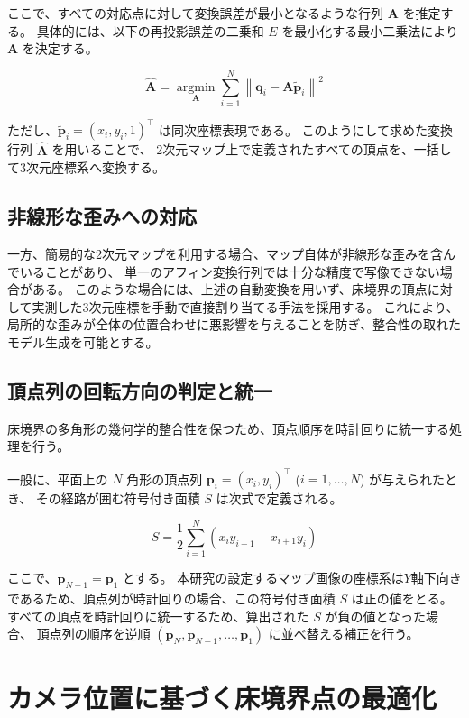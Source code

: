 ここで、すべての対応点に対して変換誤差が最小となるような行列 $\bm{A}$ を推定する。
具体的には、以下の再投影誤差の二乗和 $E$ を最小化する最小二乗法により $\bm{A}$ を決定する。

\begin{equation}
\hat{\bm{A}} = \underset{\bm{A}}{\operatorname{argmin}} \sum_{i=1}^{N} \left\| \bm{q}_i - \bm{A} \tilde{\bm{p}}_i \right\|^2
\end{equation}

ただし、$\tilde{\bm{p}}_i = (x_i, y_i, 1)^\top$ は同次座標表現である。
このようにして求めた変換行列 $\hat{\bm{A}}$ を用いることで、
2次元マップ上で定義されたすべての頂点を、一括して3次元座標系へ変換する。

\subsection{非線形な歪みへの対応}

一方、簡易的な2次元マップを利用する場合、マップ自体が非線形な歪みを含んでいることがあり、
単一のアフィン変換行列では十分な精度で写像できない場合がある。
このような場合には、上述の自動変換を用いず、床境界の頂点に対して実測した3次元座標を手動で直接割り当てる手法を採用する。
これにより、局所的な歪みが全体の位置合わせに悪影響を与えることを防ぎ、整合性の取れたモデル生成を可能とする。

\subsection{頂点列の回転方向の判定と統一}\label{clockwise}

床境界の多角形の幾何学的整合性を保つため、頂点順序を時計回りに統一する処理を行う。

一般に、平面上の $N$ 角形の頂点列 $\bm{p}_i = (x_i, y_i)^\top$ ($i=1, \dots, N$) が与えられたとき、
その経路が囲む符号付き面積 $S$ は次式で定義される。

\begin{equation}
  S = \frac{1}{2} \sum_{i=1}^{N} (x_i y_{i+1} - x_{i+1} y_i)
\end{equation}

ここで、$\bm{p}_{N+1} = \bm{p}_1$ とする。
本研究の設定するマップ画像の座標系は$Y$軸下向きであるため、頂点列が時計回りの場合、この符号付き面積 $S$ は正の値をとる。
すべての頂点を時計回りに統一するため、算出された $S$ が負の値となった場合、
頂点列の順序を逆順 $(\bm{p}_N, \bm{p}_{N-1}, \dots, \bm{p}_1)$ に並べ替える補正を行う。


\section{カメラ位置に基づく床境界点の最適化}

